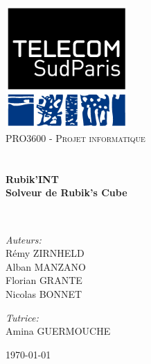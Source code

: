 \begin{titlepage}
\begin{center}

\includegraphics[width=0.35\textwidth]{./logo}~\\[1cm]

\textsc{\LARGE PRO3600 - Projet informatique}\\[1.5cm]

\textsc{\Large }\\[0.5cm]

\HRule \\[0.4cm]

{\huge \bfseries Rubik'INT\\
Solveur de Rubik's Cube \\[0.4cm] }

\HRule \\[1.5cm]

\begin{minipage}{0.4\textwidth}
\begin{flushleft} \large
\emph{Auteurs:}\\
Rémy \textsc{ZIRNHELD}\\
Alban \textsc{MANZANO}\\
Florian \textsc{GRANTE}\\
Nicolas \textsc{BONNET}
\end{flushleft}
\end{minipage}
\begin{minipage}{0.4\textwidth}
\begin{flushright} \large
\emph{Tutrice:} \\
Amina \textsc{GUERMOUCHE}
\end{flushright}
\end{minipage}

\vfill

{\large \today}

\end{center}
\end{titlepage}
